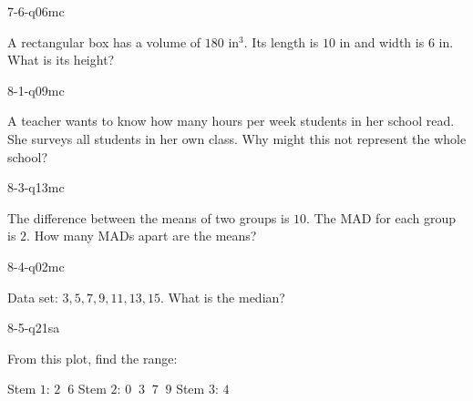 \begin{practiceQuestion}{7-6-q06}{mc}
\begin{questionText}
A rectangular box has a volume of $180$ in$^3$. Its length is $10$ in and width is $6$ in. What is its height?
\end{questionText}
\end{practiceQuestion}

\begin{practiceQuestion}{8-1-q09}{mc}
\begin{questionText}
A teacher wants to know how many hours per week students in her school read. She surveys all students in her own class. Why might this not represent the whole school?
\end{questionText}
\end{practiceQuestion}

\begin{practiceQuestion}{8-3-q13}{mc}
\begin{questionText}
The difference between the means of two groups is $10$. The MAD for each group is $2$. How many MADs apart are the means?
\end{questionText}
\end{practiceQuestion}

\begin{practiceQuestion}{8-4-q02}{mc}
\begin{questionText}
Data set: $3, 5, 7, 9, 11, 13, 15$. What is the median?
\end{questionText}
\end{practiceQuestion}

\begin{practiceQuestion}{8-5-q21}{sa}
\begin{questionText}
From this plot, find the range:

Stem $1$: $2\;\;6$ \quad Stem $2$: $0\;\;3\;\;7\;\;9$ \quad Stem $3$: $4$
\end{questionText}
\end{practiceQuestion}

